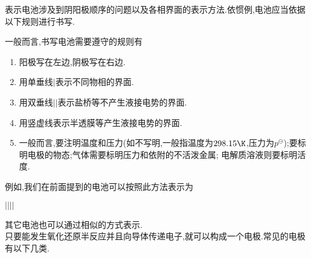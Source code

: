 \documentclass{ctexart}
\begin{document}
\indent 表示电池涉及到阴阳极顺序的问题以及各相界面的表示方法.依惯例,电池应当依据以下规则进行书写.
\begin{theorem}[6B.2.3 电池的书写方法]
    一般而言,书写电池需要遵守的规则有
    \begin{enumerate}[topsep=0pt,parsep=0pt,itemsep=0pt,partopsep=0pt,label=\tbf{\arabic*.},leftmargin=*]
        \item 阳极写在左边,阴极写在右边.
        \item 用单垂线$\vert$表示不同物相的界面.
        \item 用双垂线$\vert\vert$表示盐桥等不产生液接电势的界面.
        \item 用竖虚线\hspace{1.5pt}\hspace{1.5pt}表示半透膜等产生液接电势的界面.
        \item 一般而言,要注明温度和压力(如不写明,一般指温度为$298.15\K$,压力为$p^\ominus$);要标明电极的物态;气体需要标明压力和依附的不活泼金属;%
            电解质溶液则要标明活度.
    \end{enumerate}
\end{theorem}
例如,我们在前面提到的电池可以按照此方法表示为
\begin{tightcenter}
    $\vert$$\vert\vert$$\vert$
\end{tightcenter}
其它电池也可以通过相似的方式表示.\vspace{4pt}\\
\indent 只要能发生氧化还原半反应并且向导体传递电子,就可以构成一个电极.常见的电极有以下几类.
\end{document}

